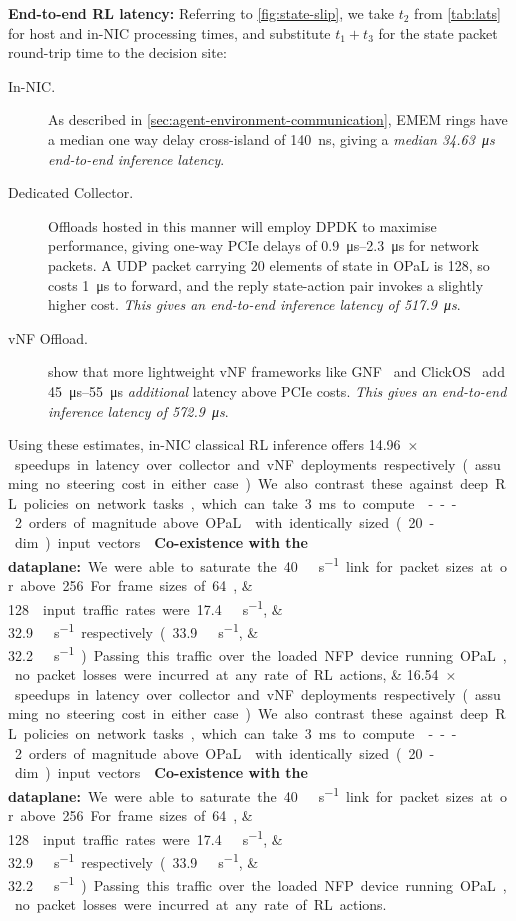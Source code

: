 \documentclass[sigconf,natbib=false]{acmart}
\newcommand{\fakepara}[1]{\noindent\textbf{#1:}}
\newcommand{\approachshort}{OPaL}
\begin{document}
\fakepara{End-to-end RL latency}
Referring to \cref{fig:state-slip}, we take $t_2$ from \cref{tab:lats} for host and in-NIC processing times, and substitute $t_1+t_3$ for the state packet round-trip time to the decision site:
\begin{description}
	\item[In-NIC.] As described in \cref{sec:agent-environment-communication}, EMEM rings have a median one way delay cross-island of \SI{140}{\nano\second}, giving a \emph{median \SI{34.63}{\micro\second} end-to-end inference latency}.
	\item[Dedicated Collector.] Offloads hosted in this manner will employ DPDK to maximise performance, giving one-way PCIe delays of \SIrange{0.9}{2.3}{\micro\second} for network packets.
	A UDP packet carrying \num{20} elements of state in \approachshort{} is \SI{128}{\byte}, so costs \SI{1}{\micro\second} to forward, and the reply state-action pair invokes a slightly higher cost.
	\emph{This gives an end-to-end inference latency of \SI{517.9}{\micro\second}}.
	\item[vNF Offload.] \Textcite{DBLP:journals/cm/CzivaP17} show that more lightweight vNF frameworks like GNF~\parencite{DBLP:journals/cm/CzivaP17} and ClickOS~\parencite{DBLP:conf/nsdi/MartinsAROHBH14} add \SIrange{45}{55}{\micro\second} \emph{additional} latency above PCIe costs.
	\emph{This gives an end-to-end inference latency of \SI{572.9}{\micro\second}}.
\end{description}
Using these estimates, in-NIC classical RL inference offers \SIlist{14.96;16.54}{$\times$} speedups in latency over collector and vNF deployments respectively (assuming no steering cost in either case).
We also contrast these against deep RL policies on network tasks, which can take \SI{3}{\milli\second} to compute~\parencite{DBLP:journals/corr/abs-1910-04054}---2 orders of magnitude above \approachshort{} with identically sized (20-dim) input vectors.

\fakepara{Co-existence with the dataplane}
We were able to saturate the \SI{40}{\giga\bit\per\second} link for packet sizes at or above \SI{256}{\byte}.
For frame sizes of \SIlist{64;128}{\byte} input traffic rates were \SIlist{17.4;32.9}{\giga\bit\per\second} respectively (\SIlist[per-symbol=p,sticky-per=true]{33.9;32.2}{\mega\packet\per\second}).
Passing this traffic over the loaded NFP device running \approachshort, no packet losses were incurred at any rate of RL actions.
\end{document}

